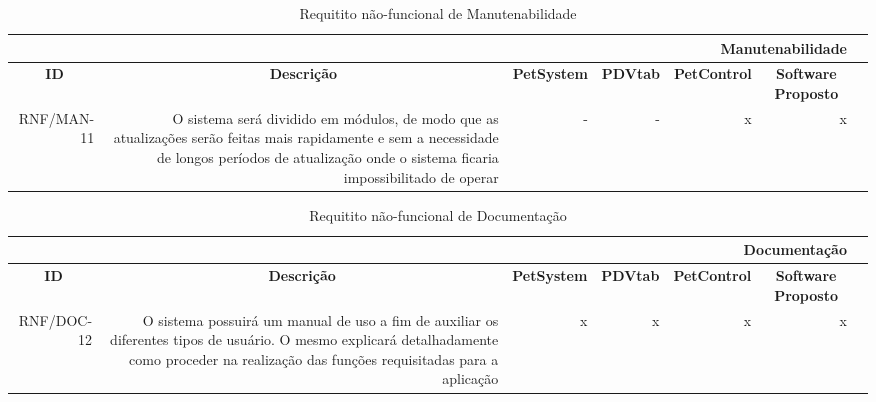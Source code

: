 \documentclass[12pt,openright,twoside,a4paper,english,french,spanish,brazil]{abntex2}
\begin{document}
\begin{table}[htbp]
  \centering
    \begin{tabular}{r|r|r|r|r|rr|}
    \toprule
    \multicolumn{6}{r}{\textbf{Manutenabilidade}} \\
    \midrule
    \multicolumn{1}{c}{\textbf{ID}} & \multicolumn{1}{c}{\textbf{Descrição}} & \multicolumn{1}{c}{\textbf{PetSystem}} & \multicolumn{1}{c}{\textbf{PDVtab}} & \multicolumn{1}{c}{\textbf{PetControl}} & \multicolumn{1}{c}{\textbf{Software Proposto}} \\
    RNF/MAN-11 & O sistema será dividido em módulos, de modo que as atualizações serão feitas mais rapidamente e sem a necessidade de longos períodos de atualização onde o sistema ficaria impossibilitado de operar & - & - & x & x \\
    \bottomrule
    \end{tabular}%
      \caption{Requitito não-funcional de Manutenabilidade}\label{tab:RNF_MAN}%
\end{table}%


\begin{table}[htbp]
  \centering
    \begin{tabular}{r|r|r|r|r|rr|}
    \toprule
    \multicolumn{6}{r}{\textbf{Documentação}} \\
    \midrule
    \multicolumn{1}{c}{\textbf{ID}} & \multicolumn{1}{c}{\textbf{Descrição}} & \multicolumn{1}{c}{\textbf{PetSystem}} & \multicolumn{1}{c}{\textbf{PDVtab}} & \multicolumn{1}{c}{\textbf{PetControl}} & \multicolumn{1}{c}{\textbf{Software Proposto}} \\
    RNF/DOC-12 & O sistema possuirá um manual de uso a fim de auxiliar os diferentes tipos de usuário. O mesmo explicará detalhadamente como proceder na realização das funções requisitadas para a aplicação & x & x & x & x \\
    \bottomrule
    \end{tabular}%
      \caption{Requitito não-funcional de Documentação}\label{tab:RNF_DOC}%
\end{table}%





\end{document}
